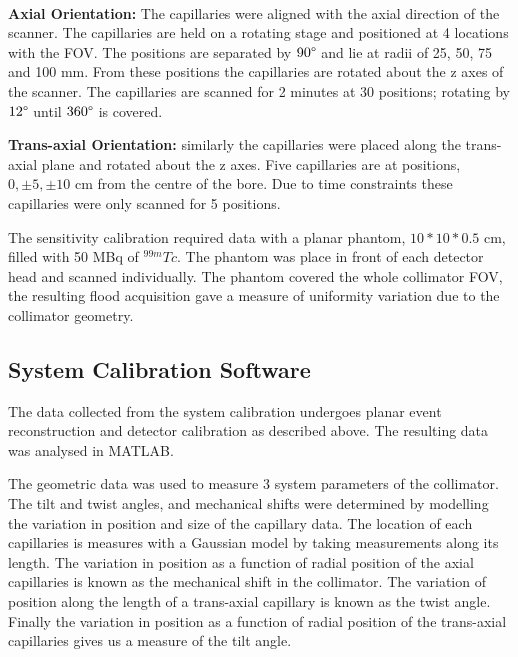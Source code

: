 \paragraph{}

\textbf{Axial Orientation:} The capillaries were aligned with the axial direction of the scanner. The capillaries are held on a rotating stage and positioned at 4 locations with the \acrshort{FOV}. The positions are separated by $90\degree$ and lie at radii of 25, 50, 75 and 100 mm. From these positions the capillaries are rotated about the z axes of the scanner. The capillaries are scanned for 2 minutes at 30 positions; rotating by $12\degree$ until $360\degree$ is covered. 

\textbf{Trans-axial Orientation:} similarly the capillaries were placed along the trans-axial plane and rotated about the z axes. Five capillaries are at positions, $ 0, \pm 5, \pm 10 $ cm from the centre of the bore. Due to time constraints these capillaries were only scanned for 5 positions.

The sensitivity calibration required data with a planar phantom, $10 * 10 * 0.5$ cm, filled with 50 MBq of $^{99m}Tc$. The phantom was place in front of each detector head and scanned individually. The phantom covered the whole collimator \acrshort{FOV}, the resulting flood acquisition gave a measure of uniformity variation due to the collimator geometry. 

\subsection{System Calibration Software}
The data collected from the system calibration undergoes planar event reconstruction and detector calibration as described above. The resulting data was analysed in MATLAB.

The geometric data was used to measure 3 system parameters of the collimator. The tilt and twist angles, and mechanical shifts were determined by modelling the variation in position and size of the capillary data. The location of each capillaries is measures with a Gaussian model by taking measurements along its length. The variation in position as a function of radial position of the axial capillaries is known as the mechanical shift in the collimator. The variation of position along the length of a trans-axial capillary is known as the twist angle. Finally the variation in position as a function of radial position of the trans-axial capillaries gives us a measure of the tilt angle. 

